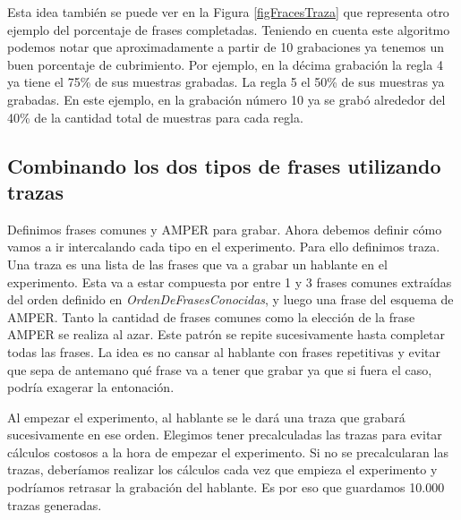 \normalsize

Esta idea también se puede ver en la Figura \ref{figFracesTraza} que representa otro ejemplo del porcentaje de frases completadas. Teniendo en cuenta este algoritmo podemos notar que aproximadamente a partir de 10 grabaciones ya tenemos un buen porcentaje de cubrimiento. Por ejemplo, en la décima grabación la regla 4 ya tiene el 75\% de sus muestras grabadas. La regla 5 el 50\% de sus muestras ya grabadas. En este ejemplo, en la grabación número 10 ya se grabó alrededor del 40\% de la cantidad total de muestras para cada regla.


\subsection{Combinando los dos tipos de frases utilizando trazas}

Definimos frases comunes y AMPER para grabar. Ahora debemos definir cómo vamos a ir intercalando cada tipo en el experimento. Para ello definimos traza. Una traza es una lista de las frases que va a grabar un hablante en el experimento. Esta va a estar compuesta por entre 1 y 3 frases comunes extraídas del orden definido en \textit{OrdenDeFrasesConocidas}, y luego una frase del esquema de AMPER. Tanto la cantidad de frases comunes como la elección de la frase AMPER se realiza al azar. Este patrón se repite sucesivamente hasta completar todas las frases. La idea es no cansar al hablante con frases repetitivas y evitar que sepa de antemano qué frase va a tener que grabar ya que si fuera el caso, podría exagerar la entonación.

Al empezar el experimento, al hablante se le dará una traza que grabará sucesivamente en ese orden. Elegimos tener precalculadas las trazas para evitar cálculos costosos a la hora de empezar el experimento. Si no se precalcularan las trazas, deberíamos realizar los cálculos cada vez que empieza el experimento y podríamos retrasar la grabación del hablante. Es por eso que guardamos 10.000 trazas generadas. 


